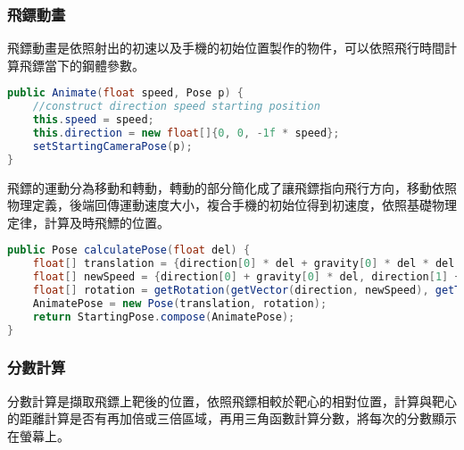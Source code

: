 \subsubsection{飛鏢動畫}

飛鏢動畫是依照射出的初速以及手機的初始位置製作的物件，可以依照飛行時間計算飛鏢當下的鋼體參數。

\begin{lstlisting}[language=Java, caption=Animate]
public Animate(float speed, Pose p) {
    //construct direction speed starting position
    this.speed = speed;
    this.direction = new float[]{0, 0, -1f * speed};
    setStartingCameraPose(p);
}
\end{lstlisting}

飛鏢的運動分為移動和轉動，轉動的部分簡化成了讓飛鏢指向飛行方向，移動依照物理定義，後端回傳運動速度大小，複合手機的初始位得到初速度，依照基礎物理定律，計算及時飛鰾的位置。

\begin{lstlisting}[language=Java, caption=calculatePose]
public Pose calculatePose(float del) {
    float[] translation = {direction[0] * del + gravity[0] * del * del, direction[1] * del + gravity[1] * del * del, direction[2] * del + gravity[2] * del * del};
    float[] newSpeed = {direction[0] + gravity[0] * del, direction[1] + gravity[1] * del, direction[2] + gravity[2] * del};
    float[] rotation = getRotation(getVector(direction, newSpeed), getTheta(direction, newSpeed));
    AnimatePose = new Pose(translation, rotation);
    return StartingPose.compose(AnimatePose);
}
\end{lstlisting}

\subsubsection{分數計算}

分數計算是擷取飛鏢上靶後的位置，依照飛鏢相較於靶心的相對位置，計算與靶心的距離計算是否有再加倍或三倍區域，再用三角函數計算分數，將每次的分數顯示在螢幕上。

